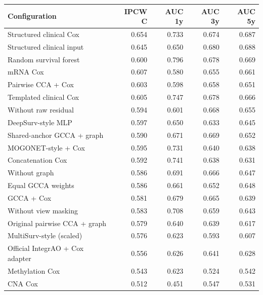 \documentclass[10pt]{article}
\begin{document}
\begin{center}
\footnotesize
\begin{tabular}{lrrrr}\hline
Configuration & IPCW C & AUC 1y & AUC 3y & AUC 5y\\\hline
Structured clinical Cox & 0.654 & 0.733 & 0.674 & 0.687\\
Structured clinical input & 0.645 & 0.650 & 0.680 & 0.688\\
Random survival forest & 0.600 & 0.796 & 0.678 & 0.669\\
mRNA Cox & 0.607 & 0.580 & 0.655 & 0.661\\
Pairwise CCA + Cox & 0.603 & 0.598 & 0.658 & 0.651\\
Templated clinical Cox & 0.605 & 0.747 & 0.678 & 0.666\\
Without raw residual & 0.594 & 0.601 & 0.668 & 0.655\\
DeepSurv-style MLP & 0.597 & 0.650 & 0.633 & 0.645\\
Shared-anchor GCCA + graph & 0.590 & 0.671 & 0.669 & 0.652\\
MOGONET-style + Cox & 0.595 & 0.731 & 0.640 & 0.638\\
Concatenation Cox & 0.592 & 0.741 & 0.638 & 0.631\\
Without graph & 0.586 & 0.691 & 0.666 & 0.647\\
Equal GCCA weights & 0.586 & 0.661 & 0.652 & 0.648\\
GCCA + Cox & 0.581 & 0.679 & 0.665 & 0.639\\
Without view masking & 0.583 & 0.708 & 0.659 & 0.643\\
Original pairwise CCA + graph & 0.579 & 0.640 & 0.639 & 0.617\\
MultiSurv-style (scaled) & 0.576 & 0.623 & 0.593 & 0.607\\
Official IntegrAO + Cox adapter & 0.556 & 0.626 & 0.641 & 0.628\\
Methylation Cox & 0.543 & 0.623 & 0.524 & 0.542\\
CNA Cox & 0.512 & 0.451 & 0.547 & 0.531\\
\hline\end{tabular}
\end{center}
\end{document}

